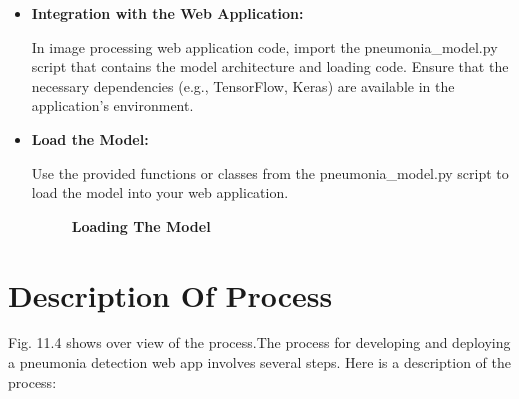 \begin{itemize}
	
	
	\item \textbf {	Integration with the Web Application:}
	
	In  image processing web application code, import the pneumonia\_model.py script that contains the model architecture and loading code.
	Ensure that the necessary dependencies (e.g., TensorFlow, Keras) are available in the application's environment.
	
	
	\item \textbf {	Load the Model:}
	
	Use the provided functions or classes from the pneumonia\_model.py script to load the model into your web application.
	
	
	\begin{figure}
		\centering
		\caption{\textbf{Loading The Model}}
		\label{fig:Loading The Modelt}
	\end{figure}
	
	
\end{itemize}


\section{Description Of Process}

Fig. 11.4 shows over view of the process.The process for developing and deploying a pneumonia detection web app involves several steps. Here is a description of the process:

